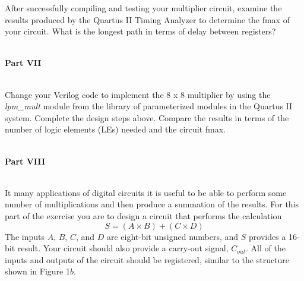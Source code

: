 \documentclass[psfig,10pt,fullpage]{article}
\begin{document}
After successfully compiling and testing your multiplier circuit, examine the results
produced by the Quartus II Timing Analyzer to determine the fmax of your circuit. 
What is the longest path in terms of delay between registers?

~\\
\noindent
{\bf Part VII}

~\\
\noindent
Change your Verilog code to implement the 8 {\sf x} 8 multiplier by using the
{\it lpm\_mult} module from the library of parameterized modules in the Quartus II
system. Complete the design steps above. Compare the results in terms of the 
number of logic elements (LEs) needed and the circuit fmax.

~\\
\noindent
{\bf Part VIII}

~\\
\noindent
It many applications of digital circuits it is useful to be able to perform some number of
multiplications and then produce a summation of the results. For this part of the exercise
you are to design a circuit that performs the calculation
$$
S = (A \times B) + (C \times D)
$$
\noindent
The inputs $A$, $B$, $C$, and $D$ are eight-bit unsigned numbers, and $S$ provides a
16-bit result. Your circuit should also provide a carry-out signal, $C_{out}$. All of the
inputs and outputs of the circuit should be registered, similar to the structure
shown in Figure 1$b$.
\end{document}

